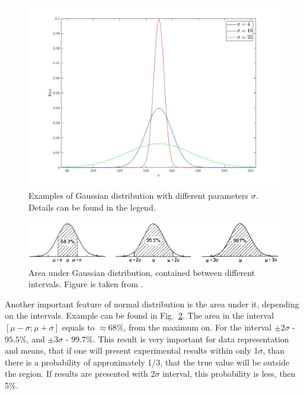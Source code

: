 \documentclass[12pt,a4paper]{report}
\begin{document}
\begin{figure}[!t]
\begin{center}
\includegraphics*[scale = 0.4]{Figures/Gauss}
\caption{\label{fig:Gaussian} Examples of Gaussian distribution with different parameters $\sigma$. Details can be found in the legend.}
\end{center}
\end{figure}
\begin{figure}[!t]
\begin{center}
\includegraphics*[scale = 0.3]{Figures/Gauss_intervals}
\caption{\label{fig:Gauss_intervals} Area under Gaussian distribution, contained between different intervals. Figure is taken from \cite{stat_2}.}
\end{center}
\end{figure}
Another important feature of normal distribution is the area under it, depending on the intervals. Example can be found in Fig.~\ref{fig:Gauss_intervals}. The area in the interval $[\mu-\sigma;\mu+\sigma]$ equals to $\approx 68\%$, from the maximum on. For the interval $\pm 2\sigma$ - $95.5\%$, and $\pm 3\sigma$ - $99.7\%$. This result is very important for data representation and means, that if one will present experimental results within only 1$\sigma$, than there is a probability of approximately 1/3, that the true value will be outside the region. If results are presented with 2$\sigma$ interval, this probability is less, then 5\%.
\end{document}
